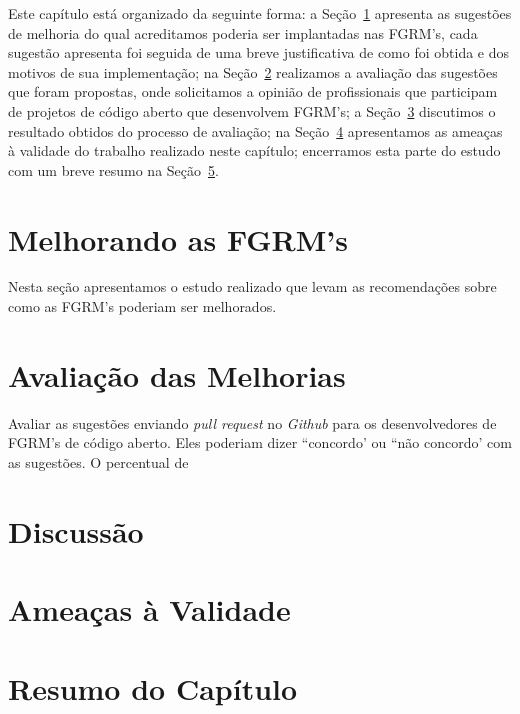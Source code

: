 Este capítulo está organizado da seguinte forma: a
Seção~\ref{sec:sug_melhoria_melhorando_as_ferraementas} apresenta as sugestões
de melhoria do qual acreditamos poderia ser implantadas nas FGRM's, cada
sugestão apresenta foi seguida de uma breve justificativa de como foi obtida e
dos motivos de sua implementação; na
Seção~\ref{sec:sug_melhoria_avaliacao_das_melhorias} realizamos a avaliação das
sugestões que foram propostas, onde solicitamos a opinião de profissionais que
participam de projetos de código aberto que desenvolvem FGRM's; a
Seção~\ref{sec:sug_melhoria_discussao} discutimos o resultado obtidos do
processo de avaliação; na Seção~\ref{sec:sug_melhoria_ameacas} apresentamos as
ameaças à validade do trabalho realizado neste capítulo; encerramos esta parte
do estudo com um breve resumo na Seção~\ref{sec:sug_melhoria_resumo}.

\section{Melhorando as FGRM's}
\label{sec:sug_melhoria_melhorando_as_ferraementas}

Nesta seção apresentamos o estudo realizado que levam as recomendações sobre
como as FGRM's poderiam ser melhorados.

\section{Avaliação das Melhorias}
\label{sec:sug_melhoria_avaliacao_das_melhorias}

Avaliar as sugestões enviando \textit{pull request} no \textit{Github} para os
desenvolvedores de FGRM's de código aberto. Eles poderiam dizer ``concordo' ou
``não concordo' com as sugestões. O percentual de

\section{Discussão}
\label{sec:sug_melhoria_discussao}

\section{Ameaças à Validade}
\label{sec:sug_melhoria_ameacas}

\section{Resumo do Capítulo}
\label{sec:sug_melhoria_resumo}

